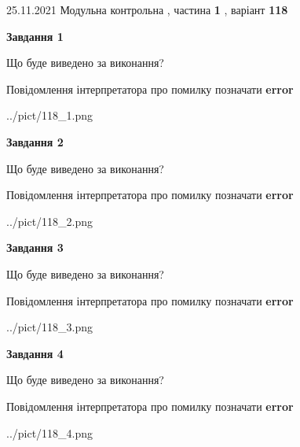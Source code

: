 \documentclass[10pt, ukrainian]{article}
\begin{document}
{25.11.2021 Модульна контрольна , частина \textbf { 1 }, варіант  \No \textbf { 118 }\par}
{
\begin {large}

{\begin {center}\textbf{Завдання 1}\end {center}}\par
Що буде виведено за виконання? \par
Повідомлення інтерпретатора про помилку позначати \textbf{error}

\begin{center}
	{../pict/118_1.png}
\end{center}
\newpage

{\begin {center}\textbf{Завдання 2}\end {center}}\par
Що буде виведено за виконання? \par
Повідомлення інтерпретатора про помилку позначати \textbf{error}

\begin{center}
	{../pict/118_2.png}
\end{center}
\newpage

{\begin {center}\textbf{Завдання 3}\end {center}}\par
Що буде виведено за виконання? \par
Повідомлення інтерпретатора про помилку позначати \textbf{error}

\begin{center}
	{../pict/118_3.png}
\end{center}
\newpage

{\begin {center}\textbf{Завдання 4}\end {center}}\par
Що буде виведено за виконання? \par
Повідомлення інтерпретатора про помилку позначати \textbf{error}

\begin{center}
	{../pict/118_4.png}
\end{center}
\newpage


\end{large}}
\end{document}
